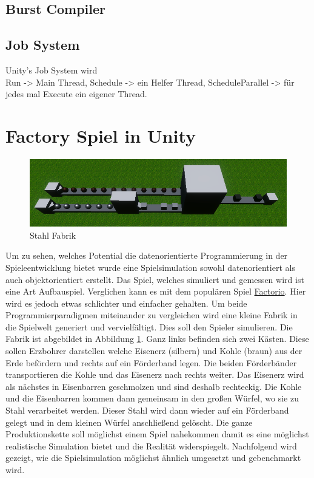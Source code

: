\documentclass[12pt, titlepage]{article}
\begin{document}
\subsection{Burst Compiler}
\subsection{Job System}
Unity's Job System wird \\
Run -> Main Thread, Schedule -> ein Helfer Thread, ScheduleParallel -> für jedes mal Execute ein eigener Thread.
\newpage
\section{Factory Spiel in Unity}
\begin{figure}
\includegraphics[scale=0.87]{Bilder/Stahl Fabrik.png}
\caption{Stahl Fabrik}
\label{fig:steel}
\end{figure}
Um zu sehen, welches Potential die datenorientierte Programmierung in der Spieleentwicklung bietet wurde eine Spielsimulation sowohl datenorientiert als auch objektorientiert erstellt. Das Spiel, welches simuliert und gemessen wird ist eine Art Aufbauspiel. Verglichen kann es mit dem populären Spiel \href{https://www.factorio.com/}{Factorio}. Hier wird es jedoch etwas schlichter und einfacher gehalten. Um beide Programmierparadigmen miteinander zu vergleichen wird eine kleine Fabrik in die Spielwelt generiert und vervielfältigt. Dies soll den Spieler simulieren. Die Fabrik ist abgebildet in Abbildung \ref{fig:steel}. Ganz links befinden sich zwei Kästen. Diese sollen Erzbohrer darstellen welche Eisenerz (silbern) und Kohle (braun) aus der Erde befördern und rechts auf ein Förderband legen. Die beiden Förderbänder transportieren die Kohle und das Eisenerz nach rechts weiter. Das Eisenerz wird als nächstes in Eisenbarren geschmolzen und sind deshalb rechteckig. Die Kohle und die Eisenbarren kommen dann gemeinsam in den großen Würfel, wo sie zu Stahl verarbeitet werden. Dieser Stahl wird dann wieder auf ein Förderband gelegt und in dem kleinen Würfel anschließend gelöscht. Die ganze Produktionskette soll möglichst einem Spiel nahekommen damit es eine möglichst realistische Simulation bietet und die Realität widerspiegelt. Nachfolgend wird gezeigt, wie die Spielsimulation möglichst ähnlich umgesetzt und gebenchmarkt wird.
\end{document}
